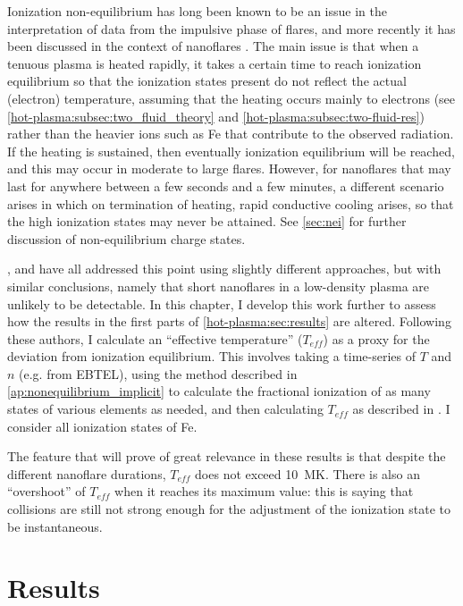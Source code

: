 Ionization non-equilibrium has long been known to be an issue in the interpretation of data from the impulsive phase of flares, and more recently it has been discussed in the context of nanoflares \citep{bradshaw_explosive_2006,reale_nonequilibrium_2008}. The main issue is that when a tenuous plasma is heated rapidly, it takes a certain time to reach ionization equilibrium so that the ionization states present do not reflect the actual (electron) temperature, assuming that the heating occurs mainly to electrons (see \autoref{hot-plasma:subsec:two_fluid_theory} and \autoref{hot-plasma:subsec:two-fluid-res}) rather than the heavier ions such as Fe that contribute to the observed radiation. If the heating is sustained, then eventually ionization equilibrium will be reached, and this may occur in moderate to large flares. However, for nanoflares that may last for anywhere between a few seconds and a few minutes, a different scenario arises in which on termination of heating, rapid conductive cooling arises, so that the high ionization states may never be attained. See \autoref{sec:nei} for further discussion of non-equilibrium charge states.

\citet{bradshaw_explosive_2006}, \citet{reale_nonequilibrium_2008} and \citet{bradshaw_numerical_2009} have all addressed this point using slightly different approaches, but with similar conclusions, namely that short nanoflares in a low-density plasma are unlikely to be detectable. In this chapter, I develop this work further to assess how the results in the first parts of \autoref{hot-plasma:sec:results} are altered. Following these authors, I calculate an ``effective temperature'' ($T_{eff}$) as a proxy for the deviation from ionization equilibrium. This involves taking a time-series of $T$ and $n$ (e.g. from EBTEL), using the method described in \autoref{ap:nonequilibrium_implicit} to calculate the fractional ionization of as many states of various elements as needed, and then calculating $T_{eff}$ as described in \citet{bradshaw_numerical_2009}. I consider all ionization states of Fe.

The feature that will prove of great relevance in these results is that despite the different nanoflare durations, $T_{eff}$ does not exceed \SI{10}{\mega\kelvin}. There is also an ``overshoot'' of $T_{eff}$ when it reaches its maximum value: this is saying that collisions are still not strong enough for the adjustment of the ionization state to be instantaneous.

\section{Results}\label{hot-plasma:sec:results}


